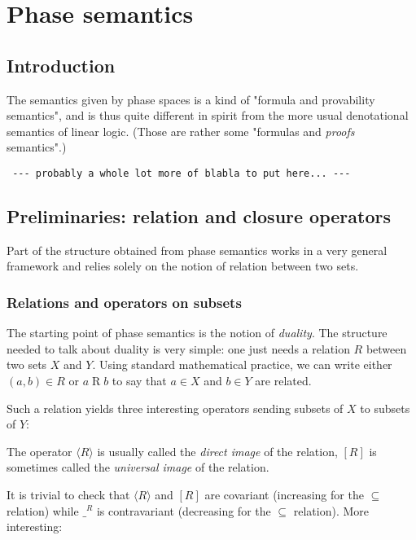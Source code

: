 \chapter{Phase semantics}\label{phase-semantics}

\section{Introduction}\label{introduction}

The semantics given by phase spaces is a kind of "formula and
provability semantics", and is thus quite different in spirit from the
more usual denotational semantics of linear logic. (Those are rather
some "formulas and \emph{proofs} semantics".)

\texttt{~-\/-\/-~probably~a~whole~lot~more~of~blabla~to~put~here...~-\/-\/-}

\section{Preliminaries: relation and closure
operators}\label{preliminaries-relation-and-closure-operators}

Part of the structure obtained from phase semantics works in a very
general framework and relies solely on the notion of relation between
two sets.

\subsection{Relations and operators on
subsets}\label{relations-and-operators-on-subsets}

The starting point of phase semantics is the notion of \emph{duality}.
The structure needed to talk about duality is very simple: one just
needs a relation \(R\) between two sets \(X\) and \(Y\). Using standard
mathematical practice, we can write either \((a,b) \in R\) or
\(a\mathrel{R} b\) to say that \(a\in X\) and \(b\in Y\) are related.

Such a relation yields three interesting operators sending subsets of
\(X\) to subsets of \(Y\):

The operator \(\langle R\rangle\) is usually called the \emph{direct
image} of the relation, \([R]\) is sometimes called the \emph{universal
image} of the relation.

It is trivial to check that \(\langle R\rangle\) and \([R]\) are
covariant (increasing for the \(\subseteq\) relation) while \(\_^R\) is
contravariant (decreasing for the \(\subseteq\) relation). More
interesting:

